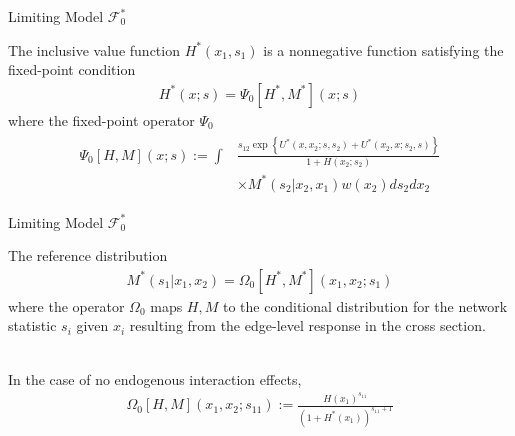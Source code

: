 \documentclass{beamer}		%
\begin{document}
\begin{frame}{Limiting Model $\mathcal{F}_0^*$}

The inclusive value function $H^*(x_1,s_1)$ is a nonnegative function satisfying the fixed-point condition
\begin{align}
    H^*(x;s) = \Psi_0[H^*, M^*](x;s)
\end{align}
where the fixed-point operator $\Psi_0$
\begin{align}
\begin{split}
     \Psi_0[H,M](x;s):=\int & \frac{s_{12} \exp \left\{ U^*(x,x_2;s,s_2) + U^*(x_2,x;s_2,s)\right\}}{1+H(x_2;s_2)} \\
     & \times M^*(s_2|x_2,x_1) w(x_2) ds_2 dx_2
\end{split}
\end{align}

\end{frame}







\begin{frame}{Limiting Model $\mathcal{F}_0^*$}

The reference distribution
\begin{align}
    M^*(s_1|x_1, x_2) = \Omega_0[H^*, M^*](x_1, x_2;s_1)
\end{align}
where the operator $\Omega_0$ maps $H, M$ to the conditional distribution for the network statistic $s_i$ given $x_i$ resulting from the edge-level response in the cross section.

~\\
In the case of no endogenous interaction effects, 
\begin{align}
    \Omega_0[H,M](x_1, x_2;s_{11}) := \frac{H(x_1)^{s_{11}}}{(1+H^*(x_1))^{s_{11}+1}}
\end{align}

\end{frame}
\end{document}
